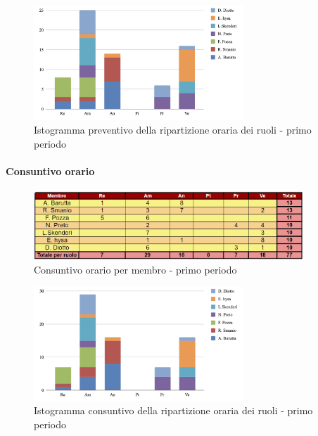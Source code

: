 \documentclass{article}
\begin{document}
\begin{figure}[H]
    \centering
    \includegraphics[width=0.7\textwidth]{../Images/preventivoDivisioneRuoli1Periodo.png}
    \caption{Istogramma preventivo della ripartizione oraria dei ruoli - primo periodo}
    \label{fig:PvD1}
\end{figure}

\paragraph{Consuntivo orario } \hspace{1pt}

\begin{figure}[h]
    \centering
    \includegraphics[width=0.9\textwidth]{../Images/consuntivoOrario1Periodo.png}
    \caption{Consuntivo orario per membro - primo periodo}
    \label{fig:Cv1}
\end{figure}

\begin{figure}[H]
    \centering
    \includegraphics[width=0.7\textwidth]{../Images/consuntivoDivisioneRuoli1Periodo.png}
    \caption{Istogramma consuntivo della ripartizione oraria dei ruoli - primo periodo}
    \label{fig:PvD1}
\end{figure}
\end{document}
